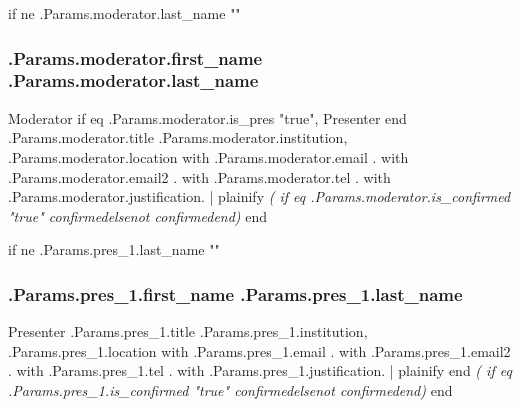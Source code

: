 \documentclass{report}
\begin{document}
              {{ if ne .Params.moderator.last_name "" }}
                \subsubsection*{ {{.Params.moderator.first_name}} {{.Params.moderator.last_name}} }
                Moderator{{ if eq .Params.moderator.is_pres "true"}}, Presenter{{ end }}\newline
                {{.Params.moderator.title}}\newline
                {{.Params.moderator.institution}}, {{.Params.moderator.location}}
                \newline
                {{ with .Params.moderator.email }}{{.}}
                {{ with .Params.moderator.email2 }}{{.}}
                {{ with .Params.moderator.tel }}{{.}}
                \newline
                \newline
                {{ with .Params.moderator.justification}}{{. | plainify }}
                \emph{ ({{ if eq .Params.moderator.is_confirmed "true" }}confirmed{{else}}not confirmed{{end}}) }
              {{ end }}

              {{ if ne .Params.pres_1.last_name "" }}
                \subsubsection*{ {{.Params.pres_1.first_name}} {{.Params.pres_1.last_name}} }
                Presenter\newline
                {{.Params.pres_1.title}}\newline
                {{.Params.pres_1.institution}}, {{.Params.pres_1.location}}
                \newline
                {{ with .Params.pres_1.email }}{{.}}
                {{ with .Params.pres_1.email2 }}{{.}}
                {{ with .Params.pres_1.tel }}{{.}}
                \newline
                \newline
                {{ with .Params.pres_1.justification}}{{. | plainify }}{{ end }}
                \emph{ ({{ if eq .Params.pres_1.is_confirmed "true" }}confirmed{{else}}not confirmed{{end}}) }
              {{ end }}
\end{document}

